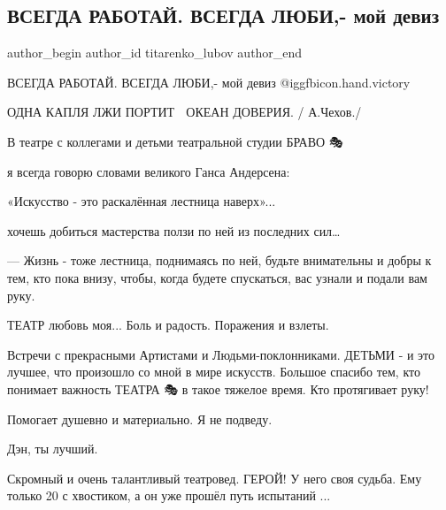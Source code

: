  
 
 
 
 
 
\subsection{ВСЕГДА РАБОТАЙ. ВСЕГДА ЛЮБИ,- мой девиз}
\label{sec:13_11_2021.fb.titarenko_lubov.1.vsegda_rabotaj_vsegda_ljubi}
 
\ifcmt
 author_begin
   author_id titarenko_lubov
 author_end
\fi

ВСЕГДА РАБОТАЙ. ВСЕГДА ЛЮБИ,- мой девиз @igg{fbicon.hand.victory}

ОДНА КАПЛЯ ЛЖИ  ПОРТИТ  🌊 ОКЕАН ДОВЕРИЯ. / А.Чехов./

В театре  с коллегами и детьми театральной студии БРАВО 🎭 

я всегда говорю словами  великого  Ганса Андерсена:

«Искусство - это раскалённая лестница наверх»...  

хочешь добиться мастерства ползи по ней из последних сил…  

 — Жизнь - тоже лестница, поднимаясь по ней, будьте внимательны и добры к тем,
 кто пока внизу,  чтобы, когда  будете  спускаться, вас узнали  и подали  вам
 руку.

ТЕАТР любовь моя...  Боль и радость. Поражения и взлеты. 

Встречи с прекрасными Артистами и Людьми-поклонниками. 
ДЕТЬМИ - и это лучшее, что произошло со мной в мире искусств.
Большое спасибо тем, кто понимает важность ТЕАТРА 🎭
в такое тяжелое время. Кто протягивает руку! 

Помогает душевно и материально. Я не подведу.  

Дэн, ты лучший. 

Скромный и очень талантливый театровед. ГЕРОЙ!
У него своя судьба. Ему только 20 с хвостиком, 
а он уже прошёл путь испытаний ... 


